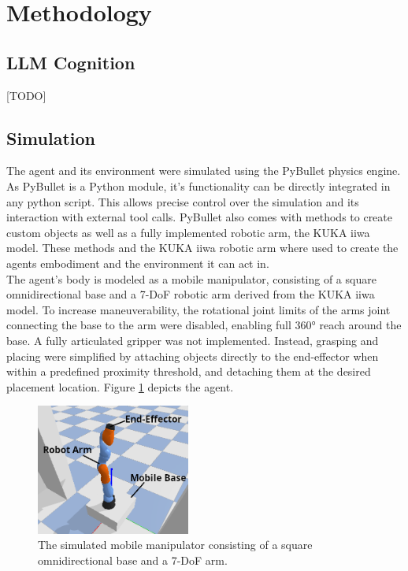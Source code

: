 \documentclass[../report.tex]{subfiles}
\begin{document}
\section{Methodology}
\label{sec:methodology}

\subsection{LLM Cognition}
[TODO]

\subsection{Simulation}
The agent and its environment were simulated using the PyBullet physics engine. As PyBullet is a Python module, it's functionality can be directly integrated in any python script. This allows precise control over the simulation and its interaction with external tool calls. PyBullet also comes with methods to create custom objects as well as a fully implemented robotic arm, the KUKA iiwa model. These methods and the KUKA iiwa robotic arm where used to create the agents embodiment and the environment it can act in. \\
The agent's body is modeled as a mobile manipulator, consisting of a square omnidirectional base and a 7-DoF robotic arm derived from the KUKA iiwa model.
To increase maneuverability, the rotational joint limits of the arms joint connecting the base to the arm were disabled, enabling full 360° reach around the base. A fully articulated gripper was not implemented. Instead, grasping and placing were simplified by attaching objects directly to the end-effector when within a predefined proximity threshold, and detaching them at the desired placement location. Figure \ref{fig:agent} depicts the agent.

\begin{figure}[h!]
	\centering
	\includegraphics[width=0.45\textwidth]{figures/agent.png}
	\caption{The simulated mobile manipulator consisting of a square omnidirectional base and a 7-DoF arm.}
	\label{fig:agent}
\end{figure}
\end{document}
